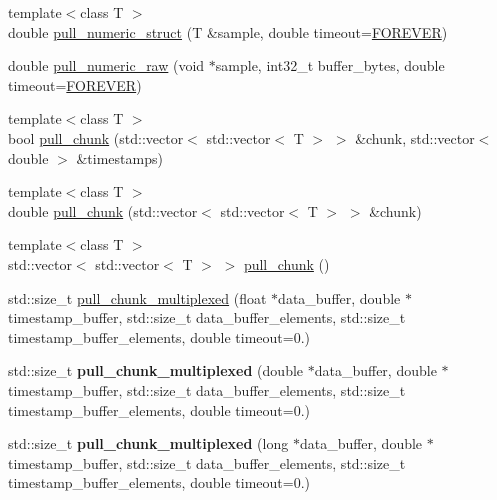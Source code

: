 \begin{DoxyCompactItemize}
\item 
{\footnotesize template$<$class T $>$ }\\double \hyperlink{classlsl_1_1stream__inlet_a540c7ba2c23188916ffe311c26c2c081}{pull\+\_\+numeric\+\_\+struct} (T \&sample, double timeout=\hyperlink{namespacelsl_a74cfbc9077aca21295117217249721ed}{F\+O\+R\+E\+V\+ER})
\item 
double \hyperlink{classlsl_1_1stream__inlet_ae8f7beaaa82d192d844abdd1531f6b9a}{pull\+\_\+numeric\+\_\+raw} (void $\ast$sample, int32\+\_\+t buffer\+\_\+bytes, double timeout=\hyperlink{namespacelsl_a74cfbc9077aca21295117217249721ed}{F\+O\+R\+E\+V\+ER})
\item 
{\footnotesize template$<$class T $>$ }\\bool \hyperlink{classlsl_1_1stream__inlet_af9051121db6ffa6945bd2288b2bf2a15}{pull\+\_\+chunk} (std\+::vector$<$ std\+::vector$<$ T $>$ $>$ \&chunk, std\+::vector$<$ double $>$ \&timestamps)
\item 
{\footnotesize template$<$class T $>$ }\\double \hyperlink{classlsl_1_1stream__inlet_acf6cdc3afdbb4c31c97fb979e4aca632}{pull\+\_\+chunk} (std\+::vector$<$ std\+::vector$<$ T $>$ $>$ \&chunk)
\item 
{\footnotesize template$<$class T $>$ }\\std\+::vector$<$ std\+::vector$<$ T $>$ $>$ \hyperlink{classlsl_1_1stream__inlet_a558f53812f5dc3c19b2cbe0026a61f6a}{pull\+\_\+chunk} ()
\item 
std\+::size\+\_\+t \hyperlink{classlsl_1_1stream__inlet_a97adf2cb7d60e4b47bf25217a2b17964}{pull\+\_\+chunk\+\_\+multiplexed} (float $\ast$data\+\_\+buffer, double $\ast$timestamp\+\_\+buffer, std\+::size\+\_\+t data\+\_\+buffer\+\_\+elements, std\+::size\+\_\+t timestamp\+\_\+buffer\+\_\+elements, double timeout=0.)
\item 
\mbox{\label{classlsl_1_1stream__inlet_abdb890fbad785ed4bc39288fc2f47329}} 
std\+::size\+\_\+t {\bfseries pull\+\_\+chunk\+\_\+multiplexed} (double $\ast$data\+\_\+buffer, double $\ast$timestamp\+\_\+buffer, std\+::size\+\_\+t data\+\_\+buffer\+\_\+elements, std\+::size\+\_\+t timestamp\+\_\+buffer\+\_\+elements, double timeout=0.)
\item 
\mbox{\label{classlsl_1_1stream__inlet_aa2f2c576a6b5a3bf562878200829bb47}} 
std\+::size\+\_\+t {\bfseries pull\+\_\+chunk\+\_\+multiplexed} (long $\ast$data\+\_\+buffer, double $\ast$timestamp\+\_\+buffer, std\+::size\+\_\+t data\+\_\+buffer\+\_\+elements, std\+::size\+\_\+t timestamp\+\_\+buffer\+\_\+elements, double timeout=0.)

\end{DoxyCompactItemize}
